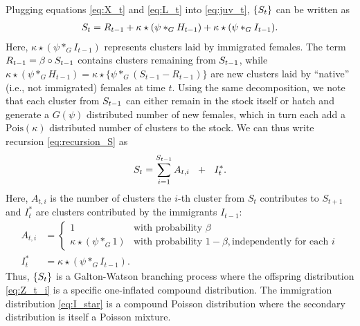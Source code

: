 \documentclass[review]{elsarticle}
\begin{document}
Plugging equations \eqref{eq:X_t} and \eqref{eq:L_t} into \eqref{eq:juv_t}, $\{S_t\}$ can be written as
\begin{align}
S_t = R_{t - 1} + \kappa \star (\psi *_G H_{t - 1}) + \kappa \star (\psi *_G I_{t - 1}). \label{eq:recursion_S}
\end{align}
Here, $\kappa \star (\psi *_G I_{t - 1})$ represents clusters laid by immigrated females. The term  $R_{t - 1} = \beta \circ S_{t - 1}$ contains clusters remaining from $ S_{t - 1}$, while $\kappa \star (\psi *_G H_{t - 1}) = \kappa \star \{\psi *_G (S_{t - 1} - R_{t - 1})\}$ are new clusters laid by ``native'' (i.e., not immigrated) females at time $t$. Using the same decomposition, we note that each cluster from $S_{t - 1}$ can either remain in the stock itself or hatch and generate a $G(\psi)$ distributed number of new females, which in turn each add a $\text{Pois}(\kappa)$ distributed number of clusters to the stock. We can thus write recursion \eqref{eq:recursion_S} as
$$
\juv_t = \sum_{i = 1}^{\juv_{t - 1}} A_{t, i} \ \ + \ \ I^*_t.
$$
Here, $A_{t, i}$ is the number of clusters the $i$-th cluster from $S_t$ contributes to $S_{t + 1}$ and $I^*_t$ are clusters contributed by the immigrants $I_{t - 1}$:
\begin{align}
A_{t, i} & = \begin{cases}
1 & \text{with probability } \beta\\
\kappa \star (\psi *_G 1) & \text{with probability } 1 - \beta, \text{independently for each } i
\label{eq:Z_t_i}
\end{cases}\\
I^*_t & = \kappa\star (\psi *_G I_{t - 1}). \label{eq:I_star}
\end{align}
Thus, $\{S_t\}$ is a Galton-Watson branching process where the offspring distribution \eqref{eq:Z_t_i} is a specific one-inflated compound distribution. %
The immigration distribution \eqref{eq:I_star} is a compound Poisson distribution where the secondary distribution is itself a Poisson mixture. %
\end{document}
